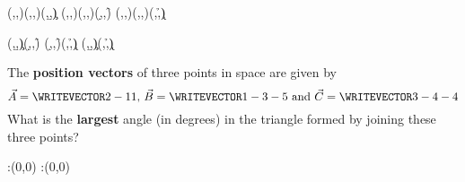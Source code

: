 
\VECTORSUB(\vd,\ve,\vf)(\va,\vb,\vc)(\a,\b,\c)
\VECTORSUB(\vg,\vh,\vi)(\vd,\ve,\vf)(\d,\e,\f)
\VECTORSUB(\va,\vb,\vc)(\vg,\vh,\vi)(\g,\h,\k)

\SCALARPRODUCT(\a,\b,\c)(\d,\e,\f)\vx
\SCALARPRODUCT(\d,\e,\f)(\g,\h,\k)\vy
\SCALARPRODUCT(\a,\b,\c)(\g,\h,\k)\vz

\question[3] The \textbf{position vectors} of three points in space 
are given by 
\[ \vec{A} = \WRITEVECTOR\va\vb\vc,\,\vec{B} = \WRITEVECTOR\vd\ve\vf 
\text{ and }\vec{C} = \WRITEVECTOR\vg\vh\vi \] 
What is the \textbf{largest} angle (in degrees) in the triangle formed by joining 
these three points?

\watchout

\ifprintanswers
  \begin{marginfigure}
      :(0,0)
      :(0,0)
    \figdrawbegin{}
      \figdrawline [100,101]
    \figdrawend
    \figvisu{\figBoxA}{}{%
    }
    \centerline{\box\figBoxA}
  \end{marginfigure}
\fi 

